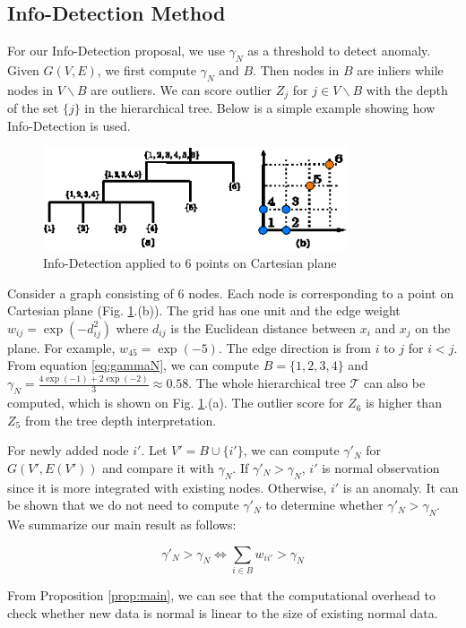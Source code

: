 \documentclass[runningheads]{llncs}
\begin{document}
\subsection{Info-Detection Method}
For our Info-Detection proposal, we use $\gamma_N$ as a threshold to detect anomaly. Given $G(V, E)$, we first compute $\gamma_N$ and $B$. Then nodes in $B$ are inliers while nodes in $V\backslash B$  are outliers. We can score outlier $Z_j$ for $j \in V\backslash B$ with the depth of the set $\{j\}$ in the hierarchical tree. Below is a simple example showing how Info-Detection is used.
\begin{example}
	\begin{figure}[!ht]
		\centering
		\includegraphics[width=9cm]{pic/outlier_example.eps}
		\caption{Info-Detection applied to 6 points on Cartesian plane}\label{fig:ex}
	\end{figure}
	Consider a graph consisting of 6 nodes. Each node is corresponding to a point on Cartesian plane (Fig. \ref{fig:ex}.(b)). The grid has one unit and the edge weight $w_{ij} = \exp(-d_{ij}^2)$ where $d_{ij}$ is the Euclidean distance between $x_i$ and $x_j$ on the plane. For example, $w_{45} = \exp(-5)$. The edge direction is from $i$ to $j$ for $i<j$. From equation \eqref{eq:gammaN}, we can compute $B=\{1,2,3,4\}$ and $\gamma_N = \frac{4\exp(-1)+2\exp(-2)}{3}\approx 0.58$. The whole hierarchical tree $\mathcal{T}$ can also be computed, which is shown on Fig. \ref{fig:ex}.(a). The outlier score for $Z_6$ is higher than $Z_5$ from the tree depth interpretation.
\end{example}
For newly added node $i'$. Let $V'=B\cup \{i'\}$, we can compute $\gamma'_N$ for $G(V', E(V'))$ and compare it with $\gamma_N$. If $\gamma'_N>\gamma_N$, $i'$ is normal observation since it is more integrated with existing nodes. Otherwise, $i'$ is an anomaly. It can be shown that we do not need to compute $\gamma'_N$ to determine whether $\gamma'_N>\gamma_N$. We summarize our main result as follows:
\begin{proposition}\label{prop:main}
\begin{equation}
\gamma'_N > \gamma_N \iff  \sum_{i \in B} w_{ii'} > \gamma_N 
\end{equation}
\end{proposition}
From Proposition \ref{prop:main}, we can see that the computational overhead to check whether new data is normal is linear to the size of existing normal data. 
\end{document}
